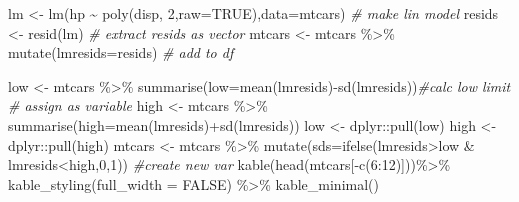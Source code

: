 \documentclass[
]{article}
\newenvironment{Shaded}{\begin{snugshade}}{\end{snugshade}}
\newcommand{\AttributeTok}[1]{\textcolor[rgb]{0.77,0.63,0.00}{#1}}
\newcommand{\CommentTok}[1]{\textcolor[rgb]{0.56,0.35,0.01}{\textit{#1}}}
\newcommand{\ConstantTok}[1]{\textcolor[rgb]{0.00,0.00,0.00}{#1}}
\newcommand{\DecValTok}[1]{\textcolor[rgb]{0.00,0.00,0.81}{#1}}
\newcommand{\FunctionTok}[1]{\textcolor[rgb]{0.00,0.00,0.00}{#1}}
\newcommand{\NormalTok}[1]{#1}
\newcommand{\OtherTok}[1]{\textcolor[rgb]{0.56,0.35,0.01}{#1}}
\newcommand{\SpecialCharTok}[1]{\textcolor[rgb]{0.00,0.00,0.00}{#1}}
\begin{document}
\begin{Shaded}
\begin{Highlighting}[]
\NormalTok{lm }\OtherTok{\textless{}{-}} \FunctionTok{lm}\NormalTok{(hp }\SpecialCharTok{\textasciitilde{}} \FunctionTok{poly}\NormalTok{(disp, }\DecValTok{2}\NormalTok{,}\AttributeTok{raw=}\ConstantTok{TRUE}\NormalTok{),}\AttributeTok{data=}\NormalTok{mtcars) }\CommentTok{\# make lin model}
\NormalTok{resids }\OtherTok{\textless{}{-}} \FunctionTok{resid}\NormalTok{(lm) }\CommentTok{\# extract resids as vector}
\NormalTok{mtcars }\OtherTok{\textless{}{-}}\NormalTok{ mtcars }\SpecialCharTok{\%\textgreater{}\%} \FunctionTok{mutate}\NormalTok{(}\AttributeTok{lmresids=}\NormalTok{resids) }\CommentTok{\# add to df}


\NormalTok{low }\OtherTok{\textless{}{-}}\NormalTok{ mtcars }\SpecialCharTok{\%\textgreater{}\%} \FunctionTok{summarise}\NormalTok{(}\AttributeTok{low=}\FunctionTok{mean}\NormalTok{(lmresids)}\SpecialCharTok{{-}}\FunctionTok{sd}\NormalTok{(lmresids))}\CommentTok{\#calc low limit}
 \CommentTok{\# assign as variable}
\NormalTok{high }\OtherTok{\textless{}{-}}\NormalTok{ mtcars }\SpecialCharTok{\%\textgreater{}\%} \FunctionTok{summarise}\NormalTok{(}\AttributeTok{high=}\FunctionTok{mean}\NormalTok{(lmresids)}\SpecialCharTok{+}\FunctionTok{sd}\NormalTok{(lmresids))}
\NormalTok{low }\OtherTok{\textless{}{-}}\NormalTok{ dplyr}\SpecialCharTok{::}\FunctionTok{pull}\NormalTok{(low)}
\NormalTok{high }\OtherTok{\textless{}{-}}\NormalTok{ dplyr}\SpecialCharTok{::}\FunctionTok{pull}\NormalTok{(high)                   }
\NormalTok{mtcars }\OtherTok{\textless{}{-}}\NormalTok{ mtcars }\SpecialCharTok{\%\textgreater{}\%} \FunctionTok{mutate}\NormalTok{(}\AttributeTok{sds=}\FunctionTok{ifelse}\NormalTok{(lmresids}\SpecialCharTok{\textgreater{}}\NormalTok{low }\SpecialCharTok{\&}\NormalTok{ lmresids}\SpecialCharTok{\textless{}}\NormalTok{high,}\DecValTok{0}\NormalTok{,}\DecValTok{1}\NormalTok{)) }\CommentTok{\#create new var}
\FunctionTok{kable}\NormalTok{(}\FunctionTok{head}\NormalTok{(mtcars[}\SpecialCharTok{{-}}\FunctionTok{c}\NormalTok{(}\DecValTok{6}\SpecialCharTok{:}\DecValTok{12}\NormalTok{)]))}\SpecialCharTok{\%\textgreater{}\%} 
  \FunctionTok{kable\_styling}\NormalTok{(}\AttributeTok{full\_width =} \ConstantTok{FALSE}\NormalTok{) }\SpecialCharTok{\%\textgreater{}\%} \FunctionTok{kable\_minimal}\NormalTok{()}
\end{Highlighting}
\end{Shaded}
\end{document}
